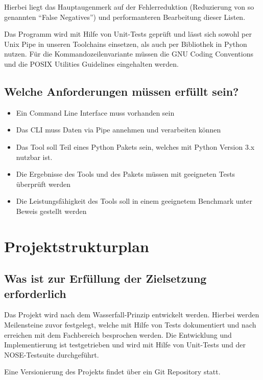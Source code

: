 \documentclass[fontsize=12pt,paper=a4,draft=off,titlepage=off]{scrartcl}
\begin{document}
Hierbei liegt das Hauptaugenmerk auf der Fehlerreduktion (Reduzierung von so genannten "`False Negatives"') und
performanteren Bearbeitung dieser Listen.\par

Das Programm wird mit Hilfe von Unit-Tests geprüft und lässt sich
sowohl per Unix Pipe in unseren Toolchains einsetzen, als auch per Bibliothek in
Python nutzen. Für die Kommandozeilenvariante müssen die GNU Coding
Conventions und die POSIX Utilities Guidelines eingehalten werden.\par

\subsection{Welche Anforderungen müssen erfüllt sein?}
\begin{itemize}
\item Ein Command Line Interface muss vorhanden sein
\item Das CLI muss Daten via Pipe annehmen und verarbeiten können
\item Das Tool soll Teil eines Python Pakets sein, welches mit Python Version
3.x nutzbar ist.
\item Die Ergebnisse des Tools und des Pakets müssen mit geeigneten Tests überprüft werden
\item Die Leistungsfähigkeit des Tools soll in einem geeignetem Benchmark unter Beweis gestellt werden
\end{itemize}

\clearpage

\section{Projektstrukturplan}
\subsection{Was ist zur Erfüllung der Zielsetzung erforderlich}
Das Projekt wird nach dem Wasserfall-Prinzip entwickelt werden. Hierbei werden
Meilensteine zuvor festgelegt, welche mit Hilfe von Tests dokumentiert und nach
erreichen mit dem Fachbereich besprochen werden.
Die Entwicklung und Implementierung ist testgetrieben und wird mit Hilfe von
Unit-Tests und der NOSE-Testsuite durchgeführt.\par
Eine Versionierung des Projekts findet über ein Git Repository statt.
\end{document}
